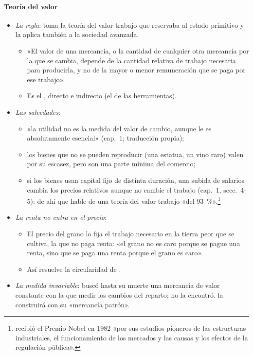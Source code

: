 \documentclass[11pt]{article}
\begin{document}
\paragraph{Teoría del valor}\label{sec:ricardo-valor}
\begin{itemize}
\item \emph{La regla}:  toma la teoría del valor trabajo que  reservaba al estado primitivo y la aplica también a la sociedad avanzada.
  \begin{itemize}
  \item «El valor de una mercancía, o la cantidad de cualquier otra mercancía por la que se cambia, depende de la cantidad relativa de trabajo necesaria para producirla, y no de la mayor o menor remuneración que se paga por ese trabajo»\nocite{Ricardo1821Principles}.
  \item Es el , directo e indirecto (el de las herramientas).
  \end{itemize}
\item \emph{Las salvedades}:
  \begin{itemize}
  \item «la utilidad no es la medida del valor de cambio, aunque le es absolutamente esencial» (cap.~1; traducción propia);
  \item los bienes que no se pueden reproducir (una estatua, un vino raro) valen por su escasez, pero son una parte mínima del comercio\nocite{Ricardo1817Principles};
  \item si los bienes usan capital fijo de distinta duración, una subida de salarios cambia los precios relativos aunque no cambie el trabajo (cap.~1, secc.~4-5): de ahí que \textcite{Stigler1958Ricardo} hable de una teoría del valor trabajo «del 93~\%».\footnote{ recibió el Premio Nobel en 1982 «por sus estudios pioneros de las estructuras industriales, el funcionamiento de los mercados y las causas y los efectos de la regulación pública»\nocite{Nobel1982Stigler}.}
  \end{itemize}
\item \emph{La renta no entra en el precio}:
  \begin{itemize}
  \item El precio del grano lo fija el trabajo necesario en la tierra peor que se cultiva, la que no paga renta: «el grano no es caro porque se pague una renta, sino que se paga una renta porque el grano es caro»\nocite{Ricardo1821Principles}.
  \item Así resuelve la circularidad de .
  \end{itemize}
\item \emph{La medida invariable}:  buscó hasta su muerte una mercancía de valor constante con la que medir los cambios del reparto; no la encontró. \textcite{Sraffa1960Production} la construirá con su «mercancía patrón».
\end{itemize}
\end{document}

